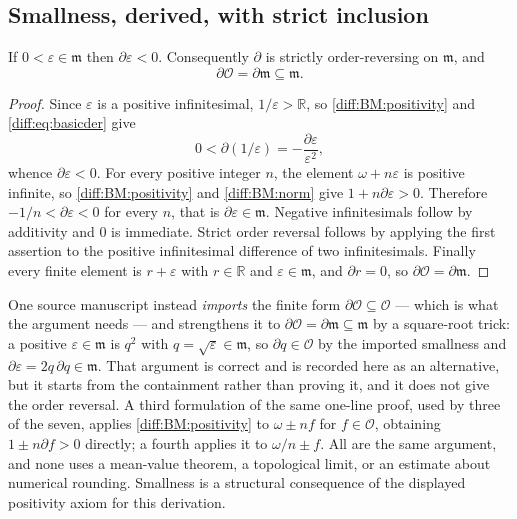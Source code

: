 \documentclass[11pt,letterpaper]{article}
\numberwithin{equation}{section}
\theoremstyle{definition}
\theoremstyle{remark}
\newcommand{\R}{\mathbb R}
\newcommand{\der}{\partial}
\newcommand{\Ofin}{\mathcal O}
\newcommand{\mm}{\mathfrak m}
\begin{document}
\subsection{Smallness, derived, with strict inclusion}
\label{diff:sub:smallness}

\begin{lemma}
\label{diff:lem:smallnegative}
If $0<\varepsilon\in\mm$ then $\der\varepsilon<0$. Consequently $\der$ is
strictly order-reversing on $\mm$, and
\[
 \der\Ofin=\der\mm\subseteq\mm .
\]
\end{lemma}
\begin{proof}
Since $\varepsilon$ is a positive infinitesimal, $1/\varepsilon>\R$, so
\ref{diff:BM:positivity} and \cref{diff:eq:basicder} give
\[
 0<\der(1/\varepsilon)=-\frac{\der\varepsilon}{\varepsilon^{2}},
\]
whence $\der\varepsilon<0$. For every positive integer $n$, the element
$\omega+n\varepsilon$ is positive infinite, so \ref{diff:BM:positivity} and
\ref{diff:BM:norm} give $1+n\der\varepsilon>0$. Therefore
$-1/n<\der\varepsilon<0$ for every $n$, that is $\der\varepsilon\in\mm$.
Negative infinitesimals follow by additivity and $0$ is immediate. Strict
order reversal follows by applying the first assertion to the positive
infinitesimal difference of two infinitesimals. Finally every finite element
is $r+\varepsilon$ with $r\in\R$ and $\varepsilon\in\mm$, and $\der r=0$, so
$\der\Ofin=\der\mm$.
\end{proof}

\begin{remark}
\label{diff:rem:sqrtsmallness}
One source manuscript instead \emph{imports} the finite form
$\der\Ofin\subseteq\Ofin$ --- which is what the argument needs --- and
strengthens it to $\der\Ofin=\der\mm\subseteq\mm$ by a square-root trick: a
positive $\varepsilon\in\mm$ is $q^{2}$ with $q=\sqrt\varepsilon\in\mm$, so
$\der q\in\Ofin$ by the imported smallness and
$\der\varepsilon=2q\,\der q\in\mm$. That argument is correct and is recorded
here as an alternative, but it starts from the containment rather than proving
it, and it does not give the order reversal. A third formulation of the same
one-line proof, used by three of the seven, applies
\ref{diff:BM:positivity} to $\omega\pm nf$ for $f\in\Ofin$, obtaining
$1\pm n\der f>0$ directly; a fourth applies it to $\omega/n\pm f$. All are the
same argument, and none uses a mean-value theorem, a topological limit, or an
estimate about numerical rounding. Smallness is a structural consequence of the displayed positivity axiom
for this derivation.
\end{remark}
\end{document}
